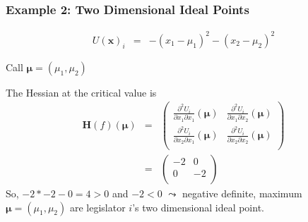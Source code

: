 \documentclass{beamer}
\numberwithin{equation}{section}
\begin{document}
\begin{frame}
\frametitle{Example 2: Two Dimensional Ideal Points} 

\begin{eqnarray}
U(\boldsymbol{x})_{i} & = & - (x_{1} - \mu_{1})^2 - (x_{2} - \mu_{2})^2 \nonumber 
\end{eqnarray} \pause

Call $\boldsymbol{\mu} = (\mu_{1}, \mu_{2} ) $\\ \pause

The Hessian at the critical value is \pause
\begin{eqnarray}
\boldsymbol{H}(f)(\boldsymbol{\mu} ) & = & \begin{pmatrix} 
\frac{\partial^{2} U_{i}} {\partial x_{1} \partial x_{1}} (\boldsymbol{\mu} ) & \frac{\partial^{2} U_{i}} {\partial x_{1} \partial x_{2}} (\boldsymbol{\mu} )  \\
\frac{\partial^{2} U_{i}} {\partial x_{2} \partial x_{1}} (\boldsymbol{\mu} ) & \frac{\partial^{2} U_{i}} {\partial x_{2} \partial x_{2}} (\boldsymbol{\mu} )\\
\end{pmatrix} \nonumber \\
& = & \begin{pmatrix} 
-2 & 0  \\
0 & -2  \\
\end{pmatrix} 
\nonumber 
\end{eqnarray} \pause
So, $-2 * -2 - 0  = 4 >0$ and $-2 <0$ $\leadsto$ \alert{negative definite}, \alert{maximum} \\
$\boldsymbol{\mu} = (\mu_{1}, \mu_{2})$ are legislator $i$'s two dimensional ideal point.  

\end{frame}
\end{document}
